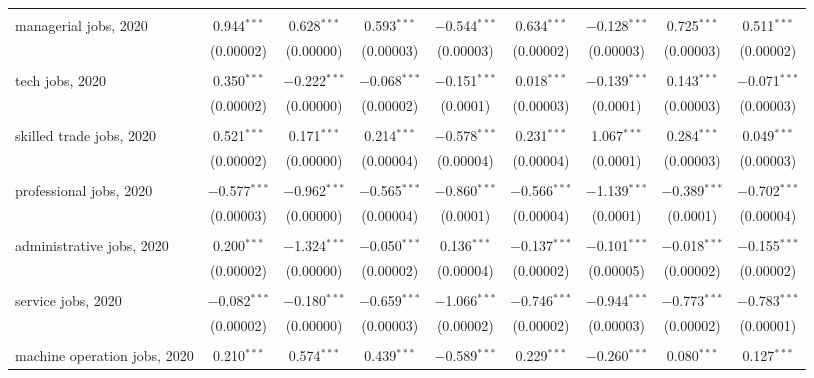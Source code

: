 \documentclass[]{interact}
\theoremstyle{plain}%
\theoremstyle{definition}
\theoremstyle{remark}
\begin{document}
\begin{table}
\begin{tabular}{@{\extracolsep{5pt}}lcccccccc}
  & & & & & & & & \\ 
 managerial jobs, 2020 & 0.944$^{***}$ & 0.628$^{***}$ & 0.593$^{***}$ & $-$0.544$^{***}$ & 0.634$^{***}$ & $-$0.128$^{***}$ & 0.725$^{***}$ & 0.511$^{***}$ \\ 
  & (0.00002) & (0.00000) & (0.00003) & (0.00003) & (0.00002) & (0.00003) & (0.00003) & (0.00002) \\ 
  & & & & & & & & \\ 
 tech jobs, 2020 & 0.350$^{***}$ & $-$0.222$^{***}$ & $-$0.068$^{***}$ & $-$0.151$^{***}$ & 0.018$^{***}$ & $-$0.139$^{***}$ & 0.143$^{***}$ & $-$0.071$^{***}$ \\ 
  & (0.00002) & (0.00000) & (0.00002) & (0.0001) & (0.00003) & (0.0001) & (0.00003) & (0.00003) \\ 
  & & & & & & & & \\ 
 skilled trade jobs, 2020 & 0.521$^{***}$ & 0.171$^{***}$ & 0.214$^{***}$ & $-$0.578$^{***}$ & 0.231$^{***}$ & 1.067$^{***}$ & 0.284$^{***}$ & 0.049$^{***}$ \\ 
  & (0.00002) & (0.00000) & (0.00004) & (0.00004) & (0.00004) & (0.0001) & (0.00003) & (0.00003) \\ 
  & & & & & & & & \\ 
 professional jobs, 2020 & $-$0.577$^{***}$ & $-$0.962$^{***}$ & $-$0.565$^{***}$ & $-$0.860$^{***}$ & $-$0.566$^{***}$ & $-$1.139$^{***}$ & $-$0.389$^{***}$ & $-$0.702$^{***}$ \\ 
  & (0.00003) & (0.00000) & (0.00004) & (0.0001) & (0.00004) & (0.0001) & (0.0001) & (0.00004) \\ 
  & & & & & & & & \\ 
 administrative jobs, 2020 & 0.200$^{***}$ & $-$1.324$^{***}$ & $-$0.050$^{***}$ & 0.136$^{***}$ & $-$0.137$^{***}$ & $-$0.101$^{***}$ & $-$0.018$^{***}$ & $-$0.155$^{***}$ \\ 
  & (0.00002) & (0.00000) & (0.00002) & (0.00004) & (0.00002) & (0.00005) & (0.00002) & (0.00002) \\ 
  & & & & & & & & \\ 
 service jobs, 2020 & $-$0.082$^{***}$ & $-$0.180$^{***}$ & $-$0.659$^{***}$ & $-$1.066$^{***}$ & $-$0.746$^{***}$ & $-$0.944$^{***}$ & $-$0.773$^{***}$ & $-$0.783$^{***}$ \\ 
  & (0.00002) & (0.00000) & (0.00003) & (0.00002) & (0.00002) & (0.00003) & (0.00002) & (0.00001) \\ 
  & & & & & & & & \\ 
 machine operation jobs, 2020 & 0.210$^{***}$ & 0.574$^{***}$ & 0.439$^{***}$ & $-$0.589$^{***}$ & 0.229$^{***}$ & $-$0.260$^{***}$ & 0.080$^{***}$ & 0.127$^{***}$ \\ 

\end{tabular}
\end{table}
\end{document}
